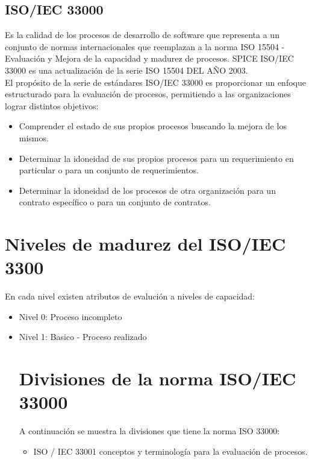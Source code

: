 \documentclass[preprint,12pt]{elsarticle}
\begin{document}
	\subsection{\textbf{ISO/IEC 33000 }}
Es la calidad de los procesos de desarrollo de software que representa a un conjunto de normas internacionales que reemplazan a la norma ISO 15504 - Evaluación y Mejora de la capacidad y madurez de procesos. SPICE ISO/IEC 33000 es una actualización de la serie ISO 15504 DEL AÑO 2003.
\\
El propósito de la serie de estándares ISO/IEC 33000 es proporcionar un enfoque estructurado para la evaluación de procesos, permitiendo a las organizaciones lograr distintos objetivos:
\\
	\begin{itemize}
\item Comprender el estado de sus propios procesos buscando la mejora de los mismos.
\item Determinar la idoneidad de sus propios procesos para un requerimiento en particular o para un conjunto de requerimientos.
\item Determinar la idoneidad de los procesos de otra organización para un contrato específico o para un conjunto de contratos.
	\end{itemize}

\section{Niveles de madurez del ISO/IEC 3300}
En cada nivel existen atributos de evalución a niveles de capacidad:
\\
\begin{itemize}
\item Nivel 0: Proceso incompleto
\item Nivel 1: Basico - Proceso realizado
\\
\section {Divisiones de la norma ISO/IEC 33000}
A continuación se muestra la divisiones que tiene la norma ISO 33000:
\begin{itemize}
\item ISO / IEC 33001 conceptos y terminología para la evaluación de procesos.
	\end{itemize}
	\end{itemize}
\end{document}
